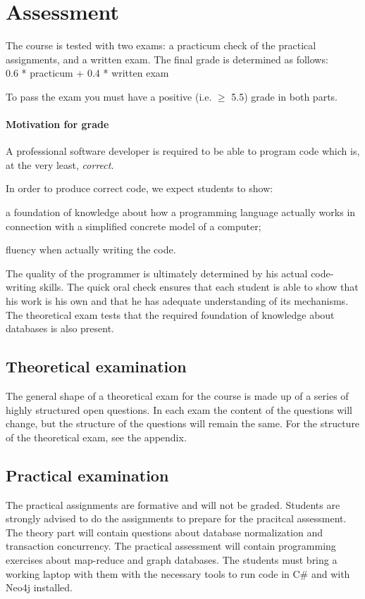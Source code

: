 \section{Assessment}
	The course is tested with two exams: a practicum check of the practical assignments, and a written exam. The final grade is determined as follows: \\

	0.6 * practicum + 0.4 * written exam

	To pass the exam you must have a positive (i.e. $\geq$ 5.5) grade in both parts.

	\paragraph*{Motivation for grade}
		A professional software developer is required to be able to program code which is, at the very least, \textit{correct}.

		In order to produce correct code, we expect students to show:
		\begin{inparaenum}
			\item a foundation of knowledge about how a programming language actually works in connection with a simplified concrete model of a computer;
			\item fluency when actually writing the code.
		\end{inparaenum}

		The quality of the programmer is ultimately determined by his actual code-writing skills. The quick oral check ensures that each student is able to show that his work is his own and that he has adequate understanding of its mechanisms. The theoretical exam tests that the required foundation of knowledge about databases is also present.


	\subsection{Theoretical examination}
		The general shape of a theoretical exam for the course is made up of a series of highly structured open questions. In each exam the content of the questions will change, but the structure of the questions will remain the same. For the structure of the theoretical exam, see the appendix.


	\subsection{Practical examination}
		The practical assignments are formative and will not be graded. Students are strongly advised to do the assignments to prepare for the pracitcal assessment. The theory part will contain questions about database normalization and transaction concurrency. The practical assessment will contain programming exercises about map-reduce and graph databases. The students must bring a working laptop with them with the necessary tools to run code in C\# and with Neo4j installed.
